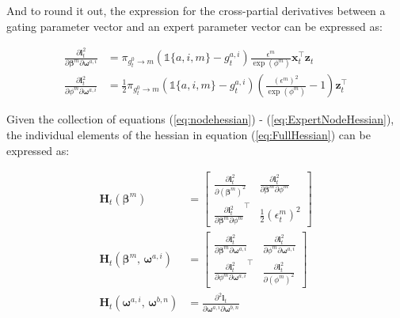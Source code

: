 \documentclass[12pt]{article}
\newcommand{\bw}[1]{\boldsymbol{\omega}^{#1}}
\newcommand{\Ht}[1]{\mathbf{H}_{t}(#1)}
\newcommand{\gateprod}[2]{\pi_{#1 \longrightarrow #2}}
\begin{document}
And to round it out, the expression for the cross-partial derivatives
between a gating parameter vector and an expert parameter vector can 
be expressed as:

\begin{align}
  \frac{\partial \boldsymbol{l}^{2}_{t}}{\partial \boldsymbol{\beta}^{m} \partial \bw{a, i}} &= \gateprod{g^{0}_{t}}{m} \left( \mathbb{1}\{a, i, m\} - g^{a,i}_{t} \right) \frac{ \epsilon^{m} }{\exp{(\phi^{m})}} \boldsymbol{x}_{t}^{\top} \boldsymbol{z}_{t} \\
  \frac{\partial \boldsymbol{l}^{2}_{t}}{\partial \phi^{m} \partial \bw{a, i}} &=  \frac{1}{2} \gateprod{g^{0}_{t}}{m} \left( \mathbb{1}\{a, i, m\} - g^{a,i}_{t} \right) \left( \frac{( \epsilon^{m} )^{2}}{\exp{(\phi^{m})}} - 1 \right) \boldsymbol{z}_{t}^{\top} \label{eq:ExpertNodeHessian}
\end{align}

Given the collection of equations (\ref{eq:nodehessian}) - (\ref{eq:ExpertNodeHessian}),
the individual elements of the hessian in equation (\ref{eq:FullHessian})
can be expressed as:

\begin{align}
  \Ht{\boldsymbol{\beta}^{m}} &= \begin{bmatrix}
    \frac{\partial \boldsymbol{l}^{2}_{t}}{\partial (\boldsymbol{\beta}^{m})^{2}}  &  \frac{\partial \boldsymbol{l}^{2}_{t}}{\partial \boldsymbol{\beta}^{m} \partial \phi^{m}}     \\
    \frac{\partial \boldsymbol{l}^{2}_{t}}{\partial \boldsymbol{\beta}^{m} \partial \phi^{m}}^{\top}       &  \frac{1}{2} (\epsilon^{m}_{t})^{2}
    \end{bmatrix} \\
    \Ht{\boldsymbol{\beta}^{m}, \, \bw{a, i}} &= \begin{bmatrix}
      \frac{\partial \boldsymbol{l}^{2}_{t}}{\partial \boldsymbol{\beta}^{m} \partial \bw{a, i}} & \frac{\partial \boldsymbol{l}^{2}_{t}}{ \partial \phi^{m} \partial \bw{a, i} } \\
      \frac{\partial \boldsymbol{l}^{2}_{t}}{\partial \phi^{m} \partial \bw{a, i}}^{\top}        & \frac{\partial \boldsymbol{l}^{2}_{t}}{\partial (\phi^{m})^{2}}
    \end{bmatrix} \\
    \Ht{\bw{a, i}, \, \bw{b, n}} &= \frac{\partial^{2} \boldsymbol{l}_{t}}{\partial \boldsymbol{\omega}^{a, i} \partial \boldsymbol{\omega}^{b,n}}
\end{align}
\end{document}
